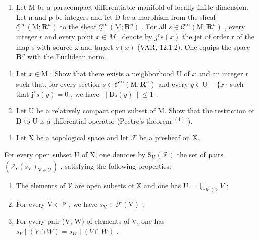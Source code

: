 \begin{enumerate}
\def\labelenumi{\arabic{enumi})}
\setcounter{enumi}{2}
\tightlist
\item
  Let M be a paracompact differentiable manifold of locally finite dimension. Let n and p be integers and let D be a morphism from the sheaf \(\underline{\mathcal{C}}^{\infty}(\mathrm{M};\mathbf{R}^{n})\) to the sheaf \(\underline{\mathcal{C}}^{\infty}(\mathrm{M};\mathbf{R}^{p})\) . For all \(s \in \mathcal{C}^{\infty}(\mathrm{M};\mathbf{R}^{n})\) , every integer \(r\) and every point \(x \in M\) , denote by \(j^{r}s(x)\) the jet of order r of the map s with source x and target \(s(x)\) (VAR, 12.1.2). One equips the space \(\mathbf{R}^{p}\) with the Euclidean norm.
\end{enumerate}

\begin{enumerate}
\def\labelenumi{\alph{enumi})}
\item
  Let \(x \in \mathrm{M}\) . Show that there exists a neighborhood U of \(x\) and an integer \(r\) such that, for every section \(s \in \mathcal{C}^{\infty}(\mathrm{M}; \mathbf{R}^{n})\) and every \(y \in \mathrm{U} - \{x\}\) such that \(\mathrm{j}^{r}s(y) = 0\) , we have \(\| \mathrm{Ds}(y) \| \leqslant 1\) .
\item
  Let U be a relatively compact open subset of M. Show that the restriction of D to U is a differential operator (Peetre's theorem \(^{(1)}\) ).
\end{enumerate}

\begin{enumerate}
\def\labelenumi{\arabic{enumi})}
\setcounter{enumi}{3}
\tightlist
\item
  Let X be a topological space and let \(\mathcal{F}\) be a presheaf on X.
\end{enumerate}

For every open subset U of X, one denotes by \(\mathrm{S}_{\mathrm{U}}(\mathcal{F})\) the set of pairs \((\mathcal{V}, (s_{\mathrm{V}})_{\mathrm{V} \in \mathcal{V}})\) , satisfying the following properties:

\begin{enumerate}
\def\labelenumi{(\roman{enumi})}
\item
  The elements of \(\mathcal{V}\) are open subsets of X and one has U = \(\bigcup_{V\in\mathcal{V}}V\) ;
\item
  For every \(\mathrm{V} \in \mathcal{V}\) , we have \(s_{\mathrm{V}} \in \mathcal{F}(\mathrm{V})\) ;
\item
  For every pair (V, W) of elements of V, one has \(s_{V} \mid (V \cap W) = s_{W} \mid (V \cap W)\) .
\end{enumerate}

